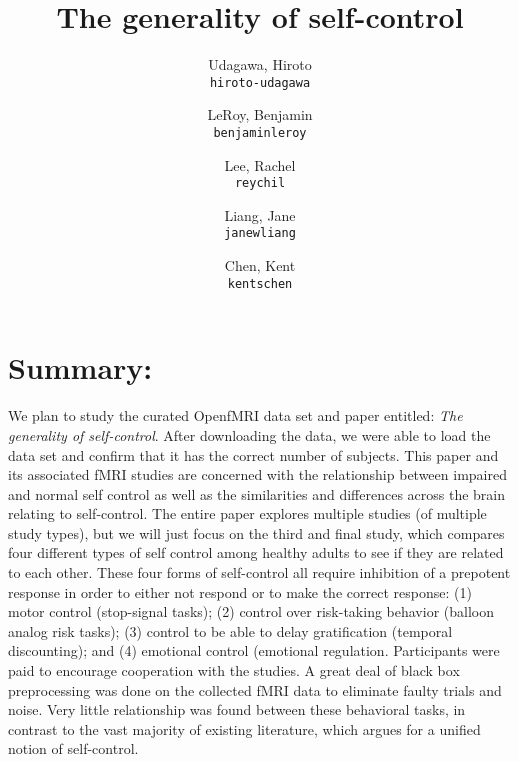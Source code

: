 \documentclass[11pt]{article}
\title{The generality of self-control}
\author{
  Udagawa, Hiroto\\
  \texttt{hiroto-udagawa}
  \and
  LeRoy, Benjamin\\
  \texttt{benjaminleroy}
  \and
  Lee, Rachel\\
  \texttt{reychil}
  \and
  Liang, Jane\\
  \texttt{janewliang}
  \and
  Chen, Kent\\
  \texttt{kentschen}
}
\begin{document}
\maketitle

\section{Summary:}
We plan to study the curated OpenfMRI data set and paper entitled: \textit{The generality of self-control}. After downloading the data, we were able to load the data set and confirm that it has the correct number of subjects. This paper and its associated fMRI studies are concerned with the relationship between impaired and normal self control as well as the similarities and differences across the brain relating to self-control. The entire paper explores multiple studies (of multiple study types), but we will just focus on the third and final study, which compares four different types of self control among healthy adults to see if they are related to each other. These four forms of self-control all require inhibition of a prepotent response in order to either not respond or to make the correct response: (1) motor control (stop-signal tasks); (2) control over risk-taking behavior (balloon analog risk tasks); (3) control to be able to delay gratification (temporal discounting); and (4) emotional control (emotional regulation. Participants were paid to encourage cooperation with the studies. A great deal of black box preprocessing was done on the collected fMRI data to eliminate faulty trials and noise. Very little relationship was found between these behavioral tasks, in contrast to the vast majority of existing literature, which argues for a unified notion of self-control.
\end{document}
